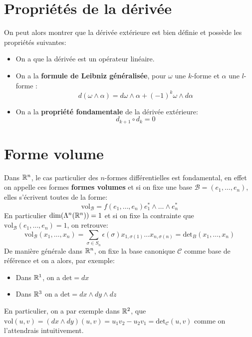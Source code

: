    \section{Propriétés de la dérivée}
   On peut alors montrer que la dérivée extérieure est bien définie et possède les propriétés suivantes:
   \begin{itemize}
      \item On a que la dérivée est un opérateur linéaire.
      \item On a la \textbf{formule de Leibniz généralisée}, pour \(\omega\) une \(k\)-forme et \(\alpha\) une \(l\)-forme : \[d(\omega \wedge \alpha) = d\omega \wedge \alpha + (-1)^k\omega \wedge d\alpha\]
      \item On a la \textbf{propriété fondamentale} de la dérivée extérieure:
      \[ 
         d_{k+1} \circ d_k = 0 
      \]
   \end{itemize}
   \section{Forme volume}
   Dans \(\mathbb{R}^n\), le cas particulier des \(n\)-formes différentielles est fondamental, en effet on appelle ces formes \textbf{formes volumes} et si on fixe une base \( \mathcal{B} = (e_1, \ldots, e_n) \), elles s'écrivent toutes de la forme:
   \[
      \text{vol}_\mathcal{B} = f(e_1, \ldots, e_n)e_1^* \wedge \ldots \wedge e_n^*
   \]
   En particulier \( \dim(\Lambda^n( \mathbb{R}^n)) = 1\) et si on fixe la contrainte que \( \text{vol}_\mathcal{B}(e_1, \ldots, e_n) = 1 \), on retrouve:
   \[ 
      \text{vol}_\mathcal{B}(x_1, \ldots, x_n) = \sum_{\sigma \in S_n} \epsilon(\sigma) x_{1, \sigma(1)} \ldots x_{n, \sigma(n)} = \text{det}_B(x_1, \ldots, x_n)
   \]
   De manière générale dans \( \mathbb{R}^n \), on fixe la base canonique \( \mathcal{C} \) comme base de référence et on a alors, par exemple:
   \begin{itemize}
      \item Dans \(\mathbb{R}^1\), on a \(\text{det} = dx\)
      \item Dans \(\mathbb{R}^3\) on a \(\text{det} = dx \wedge dy \wedge dz\)
   \end{itemize}
   En particulier, on a par exemple dans \(\mathbb{R}^2\), que \(\text{vol}(u, v) = (dx \wedge dy)(u, v) = u_1v_2 - u_2v_1 = \text{det}_\mathcal{C}(u, v)\) comme on l'attendrais intuitivement.